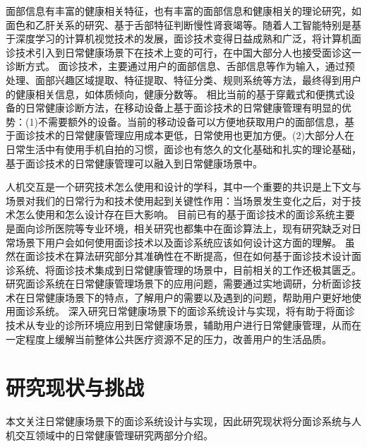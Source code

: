
面部信息有丰富的健康相关特征\cite{ding2019reading}，也有丰富的面部信息和健康相关的理论研究，如面色和乙肝关系的研究\cite{吴秀艳2014108}、基于舌部特征判断慢性肾衰竭\cite{周小芳2018慢性肾衰患者虚兼湿浊证的口唇特征研究}等。随着人工智能特别是基于深度学习的计算机视觉技术\cite{hassaballah2020deep}的发展，面诊技术变得日益成熟和广泛，将计算机面诊技术引入到日常健康场景下在技术上变的可行，在中国大部分人也接受面诊这一诊断方式。
面诊技术，主要通过用户的面部信息、舌部信息等作为输入，通过预处理、面部兴趣区域提取、特征提取、特征分类、规则系统等方法，最终得到用户的健康相关信息，如体质倾向，健康分数等\cite{林锋2019中医面诊系统调研报告}。
相比当前的基于穿戴式和便携式设备的日常健康诊断方法，在移动设备上基于面诊技术的日常健康管理有明显的优势：(1)不需要额外的设备。当前的移动设备可以方便地获取用户的面部信息，基于面诊技术的日常健康管理应用成本更低，日常使用也更加方便。(2)大部分人在日常生活中有使用手机自拍的习惯，面诊也有悠久的文化基础和扎实的理论基础，基于面诊技术的日常健康管理可以融入到日常健康场景中。

人机交互是一个研究技术怎么使用和设计的学科，其中一个重要的共识是上下文与场景对我们的日常行为和技术使用起到关键性作用：当场景发生变化之后，对于技术怎么使用和怎么设计存在巨大影响\cite{1987Plans}。
目前已有的基于面诊技术的面诊系统主要是面向诊所医院等专业环境，相关研究也都集中在面诊算法上，现有研究缺乏对日常场景下用户会如何使用面诊技术以及面诊系统应该如何设计这方面的理解。
虽然在面诊技术在算法研究部分其准确性在不断提高，但在如何基于面诊技术设计面诊系统、将面诊技术集成到日常健康管理的场景中，目前相关的工作还极其匮乏。
研究面诊系统在日常健康管理场景下的应用问题，需要通过实地调研，分析面诊技术在日常健康场景下的特点，了解用户的需要以及遇到的问题，帮助用户更好地使用面诊系统。
深入研究日常健康场景下的面诊系统设计与实现，将有助于将面诊技术从专业的诊所环境应用到日常健康场景，辅助用户进行日常健康管理，从而在一定程度上缓解当前整体公共医疗资源不足的压力，改善用户的生活品质。

\section{研究现状与挑战}
本文关注日常健康场景下的面诊系统设计与实现，因此研究现状将分面诊系统与人机交互领域中的日常健康管理研究两部分介绍。

